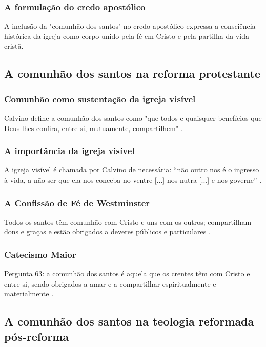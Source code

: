 \subsubsection{A formulação do credo apostólico}
A inclusão da "comunhão dos santos" no credo apostólico expressa a consciência histórica da igreja como corpo unido pela fé em Cristo e pela partilha da vida cristã.

\subsection{A comunhão dos santos na reforma protestante}

\subsubsection{Comunhão como sustentação da igreja visível}
Calvino define a comunhão dos santos como "que todos e quaisquer benefícios que Deus lhes confira, entre si, mutuamente, compartilhem" \cite{calvino2022}.

\subsubsection{A importância da igreja visível}
A igreja visível é chamada por Calvino de necessária: “não outro nos é o ingresso à vida, a não ser que ela nos conceba no ventre [...] nos nutra [...] e nos governe” \cite{calvino2022}.

\subsubsection{A Confissão de Fé de Westminster}
Todos os santos têm comunhão com Cristo e uns com os outros; compartilham dons e graças e estão obrigados a deveres públicos e particulares \cite{cfw}.

\subsubsection{Catecismo Maior}
Pergunta 63: a comunhão dos santos é aquela que os crentes têm com Cristo e entre si, sendo obrigados a amar e a compartilhar espiritualmente e materialmente \cite{catecismoMaior}.

\subsection{A comunhão dos santos na teologia reformada pós-reforma}

